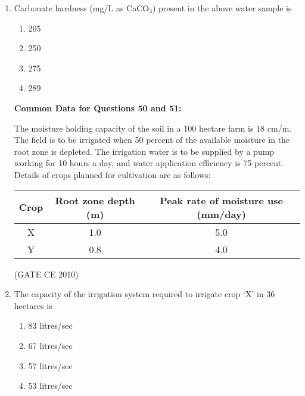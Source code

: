 \documentclass[journal]{IEEEtran}
\begin{document}
\begin{enumerate}
    
    \item Carbonate hardness (mg/L as CaCO$_3$) present in the above water sample is

    \begin{multicols}{4}
        \begin{enumerate}
            \item 205
            \item 250
            \item 275
            \item 289
        \end{enumerate}
    \end{multicols}

     \textbf{Common Data for Questions 50 and 51:}

    
    The moisture holding capacity of the soil in a 100 hectare farm is 18 cm/m. The field is to be irrigated when 50 percent of the available moisture in the root zone is depleted. The irrigation water is to be supplied by a pump working for 10 hours a day, and water application efficiency is 75 percent. Details of crops planned for cultivation are as follows:

    \begin{table}[h!]
        \centering
        \begin{tabular}{|c|c|c|}
            \hline
            \textbf{Crop} & \textbf{Root zone depth (m)} & \textbf{Peak rate of moisture use (mm/day)} \\ \hline
            X & 1.0 & 5.0 \\ \hline
            Y & 0.8 & 4.0 \\ \hline
        \end{tabular}
    \end{table} \hfill (GATE CE 2010)

    
    \item The capacity of the irrigation system required to irrigate crop `X' in 36 hectares is

    \begin{multicols}{4}
        \begin{enumerate}
            \item 83 litres/sec
            \item 67 litres/sec
            \item 57 litres/sec
            \item 53 litres/sec
        \end{enumerate}
    \end{multicols}


\end{enumerate}
\end{document}
